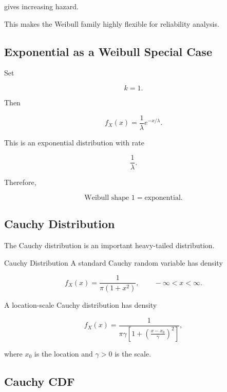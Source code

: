 gives increasing hazard.

This makes the Weibull family highly flexible for reliability analysis.

\subsection{Exponential as a Weibull Special Case}
\label{subsec:exponential-weibull-special-case}

Set

\[
k=1.
\]

Then

\[
f_X(x)
=
\frac1\lambda
e^{-x/\lambda}.
\]

This is an exponential distribution with rate

\[
\frac1\lambda.
\]

Therefore,

\[
\boxed{
\text{Weibull shape }1
=
\text{exponential}.
}
\]

\subsection{Cauchy Distribution}
\label{subsec:cauchy-distribution}

The Cauchy distribution is an important heavy-tailed distribution.

\begin{definitionbox}{Cauchy Distribution}
A standard Cauchy random variable has density

\[
\boxed{
f_X(x)
=
\frac{1}{\pi(1+x^2)},
\qquad
-\infty<x<\infty.
}
\]
\end{definitionbox}

A location-scale Cauchy distribution has density

\[
\boxed{
f_X(x)
=
\frac{1}{
\pi\gamma
\left[
1+
\left(
\frac{x-x_0}{\gamma}
\right)^2
\right]
},
}
\]

where \(x_0\) is the location and \(\gamma>0\) is the scale.

\subsection{Cauchy CDF}
\label{subsec:cauchy-cdf}

